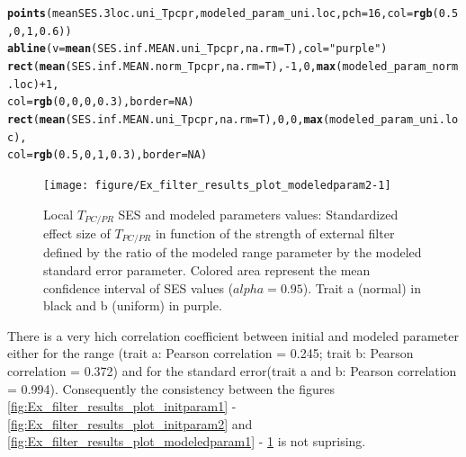 \documentclass[12pt]{article}\usepackage[]{graphicx}\usepackage[]{color}
\makeatletter
\newcommand{\hlnum}[1]{\textcolor[rgb]{0.686,0.059,0.569}{#1}}%
\newcommand{\hlstr}[1]{\textcolor[rgb]{0.192,0.494,0.8}{#1}}%
\newcommand{\hlopt}[1]{\textcolor[rgb]{0,0,0}{#1}}%
\newcommand{\hlstd}[1]{\textcolor[rgb]{0.345,0.345,0.345}{#1}}%
\newcommand{\hlkwc}[1]{\textcolor[rgb]{0.333,0.667,0.333}{#1}}%
\newcommand{\hlkwd}[1]{\textcolor[rgb]{0.737,0.353,0.396}{\textbf{#1}}}%
\newenvironment{kframe}{%
 \def\at@end@of@kframe{}%
 \ifinner\ifhmode%
  \def\at@end@of@kframe{\end{minipage}}%
  \begin{minipage}{\columnwidth}%
 \fi\fi%
 \def\FrameCommand##1{\hskip\@totalleftmargin \hskip-\fboxsep
 \colorbox{shadecolor}{##1}\hskip-\fboxsep
     \hskip-\linewidth \hskip-\@totalleftmargin \hskip\columnwidth}%
 \MakeFramed {\advance\hsize-\width
   \@totalleftmargin\z@ \linewidth\hsize
   \@setminipage}}%
 {\par\unskip\endMakeFramed%
 \at@end@of@kframe}
\newenvironment{knitrout}{}{} %
\makeatother
\begin{document}
\begin{knitrout}
\begin{kframe}
\begin{alltt}
\hlkwd{points}\hlstd{(meanSES.3loc.uni_Tpcpr, modeled_param_uni.loc,} \hlkwc{pch} \hlstd{=} \hlnum{16}\hlstd{,} \hlkwc{col} \hlstd{=} \hlkwd{rgb}\hlstd{(}\hlnum{0.5}\hlstd{,} \hlnum{0}\hlstd{,} \hlnum{1}\hlstd{,} \hlnum{0.6}\hlstd{))}
\hlkwd{abline}\hlstd{(}\hlkwc{v} \hlstd{=} \hlkwd{mean}\hlstd{(SES.inf.MEAN.uni_Tpcpr,} \hlkwc{na.rm} \hlstd{= T),} \hlkwc{col} \hlstd{=} \hlstr{"purple"}\hlstd{)}
\hlkwd{rect}\hlstd{(}\hlkwd{mean}\hlstd{(SES.inf.MEAN.norm_Tpcpr,} \hlkwc{na.rm} \hlstd{= T),} \hlopt{-}\hlnum{1}\hlstd{,} \hlnum{0}\hlstd{,} \hlkwd{max}\hlstd{(modeled_param_norm.loc)} \hlopt{+} \hlnum{1}\hlstd{,}
     \hlkwc{col} \hlstd{=} \hlkwd{rgb}\hlstd{(}\hlnum{0}\hlstd{,} \hlnum{0}\hlstd{,} \hlnum{0}\hlstd{,} \hlnum{0.3}\hlstd{),} \hlkwc{border} \hlstd{=} \hlnum{NA}\hlstd{)}
\hlkwd{rect}\hlstd{(}\hlkwd{mean}\hlstd{(SES.inf.MEAN.uni_Tpcpr,} \hlkwc{na.rm} \hlstd{= T),} \hlnum{0}\hlstd{,} \hlnum{0}\hlstd{,} \hlkwd{max}\hlstd{(modeled_param_uni.loc),}
     \hlkwc{col} \hlstd{=} \hlkwd{rgb}\hlstd{(}\hlnum{0.5}\hlstd{,} \hlnum{0}\hlstd{,} \hlnum{1}\hlstd{,} \hlnum{0.3}\hlstd{),} \hlkwc{border} \hlstd{=} \hlnum{NA}\hlstd{)}
\end{alltt}
\end{kframe}\begin{figure}

{\centering \texttt{[image: figure/Ex\_filter\_results\_plot\_modeledparam2-1]} 

}

\caption[Local $T_{PC/PR}$ SES and modeled parameters values]{Local $T_{PC/PR}$ SES and modeled parameters values: Standardized effect size of $T_{PC/PR}$ in function of the strength of external filter defined by the ratio of the modeled range parameter by the modeled standard error parameter. Colored area represent the mean confidence interval of SES values ($alpha = 0.95$). Trait a (normal) in black and b (uniform) in purple.\label{fig:Ex_filter_results_plot_modeledparam2}}
\end{figure}


\end{knitrout}

There is a very hich correlation coefficient between initial and modeled parameter either for the range (trait a: Pearson correlation = 0.245; trait b: Pearson correlation = 0.372) and for the standard error(trait a and b: Pearson correlation = 0.994). Consequently the consistency between the figures \ref{fig:Ex_filter_results_plot_initparam1} - \ref{fig:Ex_filter_results_plot_initparam2} and \ref{fig:Ex_filter_results_plot_modeledparam1} - \ref{fig:Ex_filter_results_plot_modeledparam2} is not suprising. 
 
\end{document}
